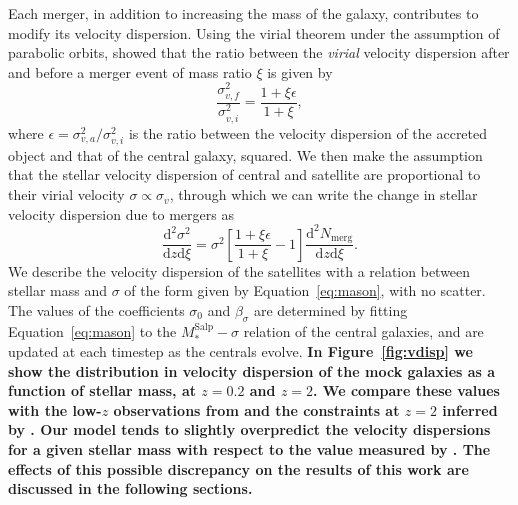 \documentclass[usenatbib, letters]{mnras}
\def\msalp{M_*^{\mathrm{Salp}}}
\def\Fref#1{Figure~\ref{#1}\xspace}
\def\Eref#1{Equation~\ref{#1}\xspace}
\begin{document}
Each merger, in addition to increasing the mass of the galaxy, contributes to modify its velocity dispersion. Using the virial theorem under the assumption of parabolic orbits, \citet{NJO09} showed that the ratio between the {\em virial} velocity dispersion after and before a merger event of mass ratio $\xi$ is given by
\begin{equation}
\frac{\sigma_{v,f}^2}{\sigma_{v,i}^2} = \frac{1 + \xi\epsilon}{1 + \xi},
\end{equation}
where $\epsilon = \sigma_{v,a}^2/\sigma_{v,i}^2$ is the ratio between the velocity dispersion of the accreted object and that of the central galaxy, squared.
We then make the assumption that the stellar velocity dispersion of central and satellite are proportional to their virial velocity $\sigma \propto \sigma_v$, through which we can write the change in stellar velocity dispersion due to mergers as
\begin{equation}
\frac{\mathrm{d}^2\sigma^2}{\mathrm{d}z\mathrm{d}\xi} = \sigma^2\left[\frac{1 + \xi\epsilon}{1 + \xi} - 1\right]\frac{\mathrm{d}^2N_{\mathrm{merg}}}{\mathrm{d}z \mathrm{d}\xi}.
\end{equation}
We describe the velocity dispersion of the satellites with a relation between stellar mass and $\sigma$ of the form given by \Eref{eq:mason}, with no scatter. The values of the coefficients $\sigma_0$ and $\beta_\sigma$ are determined by fitting \Eref{eq:mason} to the $\msalp-\sigma$ relation of the central galaxies, and are updated at each timestep as the centrals evolve.
{\bf In \Fref{fig:vdisp} we show the distribution in velocity dispersion of the mock galaxies as a function of stellar mass, at $z=0.2$ and $z=2$. We compare these values with the low-$z$ observations from \citet{Aug++10} and the constraints at $z=2$ inferred by \citet{Mas++15}.
Our model tends to slightly overpredict the velocity dispersions for a given stellar mass with respect to the value measured by \citet{Mas++15}. The effects of this possible discrepancy on the results of this work are discussed in the following sections.}
%
\end{document}
